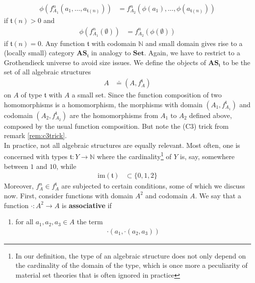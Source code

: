 \begin{exa}
\begin{align*}
  \phi
  \left(
    f_{A_{1}}^{n}(a_{1},\ldots,a_{\mathfrak{t}(n)})
  \right)
  &=
  f_{A_{2}}^{n}
  \left(
    \phi(a_{1}),
    \ldots,
    \phi(a_{\mathfrak{t}(n)})
  \right)
\end{align*}
if $\mathfrak{t}(n) > 0$ and
\begin{align*}
  \phi
  \left(
    f_{A_{1}}^{n}(\emptyset)
  \right)
  &=
  f_{A_{2}}^{n}
  \left(
    \phi(\emptyset)
  \right)
\end{align*}
if $\mathfrak{t}(n) = 0$.
Any function $\mathfrak{t}$ with codomain $\mathbb{N}$ and small domain gives rise to a (locally small) category $\mathbf{AS}_{\mathfrak{t}}$ in analogy to $\mathbf{Set}$.
Again, we have to restrict to a Grothendieck universe to avoid size issues.
We define the objects of $\mathbf{AS}_{\mathfrak{t}}$ to be the set of all algebraic structures
\begin{align*}
  A
  &\doteq
  (A,f_{A}^{\mathfrak{t}})
\end{align*}
on $A$ of type $\mathfrak{t}$ with $A$ a small set.
Since the function composition of two homomorphisms is a homomorphism, the morphisms with domain $(A_{1},f_{A_{1}}^{\mathfrak{t}})$ and codomain $(A_{2},f_{A_{2}}^{\mathfrak{t}})$ are the homomorphisms from $A_{1}$ to $A_{2}$ defined above, composed by the usual function composition.
But note the (C3) trick from remark \ref{rem:c3trick}.
\\
In practice, not all algebraic structures are equally relevant.
Most often, one is concerned with types $\mathfrak{t} \colon Y \rightarrow \mathbb{N}$ where the cardinality\footnote{In our definition, the type of an algebraic structure does not only depend on the cardinality of the domain of the type, which is once more a peculiarity of material set theories that is often ignored in practice} of $Y$ is, say, somewhere between $1$ and $10$, while
\begin{align*}
  \mathrm{im}(\mathfrak{t})
  &\subset
  \lbrace
    0,1,2
  \rbrace
\end{align*}
Moreover, $f_{A}^{n} \in f_{A}^{\mathfrak{t}}$ are subjected to certain conditions, some of which we discuss now.
First, consider functions with domain $A^{2}$ and codomain $A$.
We say that a function $\cdot \colon A^{2} \rightarrow A$ is \textbf{associative} if
\begin{enumerate}
\item[(A)]
for all $a_{1},a_{2},a_{3} \in A$ the term
\begin{align*}
  \cdot
  \left(
    a_{1},
    \cdot(a_{2},a_{3})
  \right)
\end{align*}

\end{enumerate}
\end{exa}
